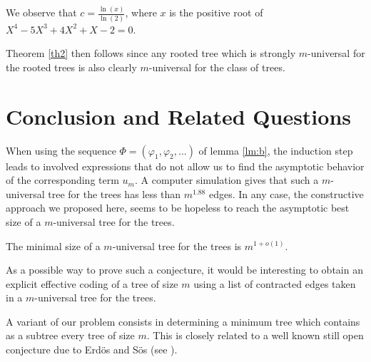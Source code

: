 \documentclass{llncs}
\begin{document}
\begin{remark} We observe that $c = \frac{\ln \left( x \right)}{\ln
\left( 2 \right)}$, where $x$ is the positive root of $X^4 - 5X^3 + 4X^2 + X
- 2 = 0$.
\end{remark}

\bigskip


Theorem \ref{th2} then follows since any rooted tree which is
strongly $m$-universal for the rooted trees is also clearly
$m$-universal for the class of trees.





\section{Conclusion and Related Questions}





When using the sequence $\Phi = \left( {\varphi _1 ,\varphi _2
,...} \right)$ of lemma \ref{lm:b}, the induction step leads to
involved expressions that do not allow us to find the asymptotic
behavior of the corresponding term $u_m $. A computer simulation
gives that such a $m$-universal tree for the trees has less than
$m^{1.88}$ edges. In any case, the constructive approach we
proposed here, seems to be hopeless to reach the asymptotic best
size of a $m$-universal tree for the trees.





\begin{conjecture} The minimal size of a $m$-universal tree for the
trees is $m^{1 + o\left( 1 \right)}$.
\end{conjecture}




As a possible way to prove such a conjecture, it would be
interesting to obtain an explicit effective coding of a tree of
size $m$ using a list of contracted edges taken in a $m$-universal
tree for the trees.

A variant of our problem consists in determining a minimum tree
which contains as a sub{\-}tree every tree of size $m.$ This is
closely related to a well known still open conjecture due to
Erd\"{o}s and S\"{o}s (see \cite{ES}).
\end{document}
